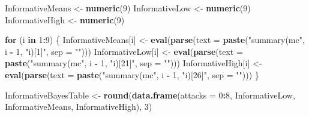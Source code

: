 \documentclass[10pt,]{scrartcl}
\newenvironment{Shaded}{\begin{snugshade}}{\end{snugshade}}
\newcommand{\KeywordTok}[1]{\textcolor[rgb]{0.13,0.29,0.53}{\textbf{#1}}}
\newcommand{\DataTypeTok}[1]{\textcolor[rgb]{0.13,0.29,0.53}{#1}}
\newcommand{\DecValTok}[1]{\textcolor[rgb]{0.00,0.00,0.81}{#1}}
\newcommand{\StringTok}[1]{\textcolor[rgb]{0.31,0.60,0.02}{#1}}
\newcommand{\ControlFlowTok}[1]{\textcolor[rgb]{0.13,0.29,0.53}{\textbf{#1}}}
\newcommand{\OperatorTok}[1]{\textcolor[rgb]{0.81,0.36,0.00}{\textbf{#1}}}
\newcommand{\NormalTok}[1]{#1}
\begin{document}
\begin{Shaded}
\begin{Highlighting}[]
\NormalTok{InformativeMeans <-}\StringTok{ }\KeywordTok{numeric}\NormalTok{(}\DecValTok{9}\NormalTok{)}
\NormalTok{InformativeLow <-}\StringTok{ }\KeywordTok{numeric}\NormalTok{(}\DecValTok{9}\NormalTok{)}
\NormalTok{InformativeHigh <-}\StringTok{ }\KeywordTok{numeric}\NormalTok{(}\DecValTok{9}\NormalTok{)}

\ControlFlowTok{for}\NormalTok{ (i }\ControlFlowTok{in} \DecValTok{1}\OperatorTok{:}\DecValTok{9}\NormalTok{) \{}
\NormalTok{    InformativeMeans[i] <-}\StringTok{ }\KeywordTok{eval}\NormalTok{(}\KeywordTok{parse}\NormalTok{(}\DataTypeTok{text =} \KeywordTok{paste}\NormalTok{(}\StringTok{"summary(mc"}\NormalTok{,}
\NormalTok{        i }\OperatorTok{-}\StringTok{ }\DecValTok{1}\NormalTok{, }\StringTok{"i)[1]"}\NormalTok{, }\DataTypeTok{sep =} \StringTok{""}\NormalTok{)))}
\NormalTok{    InformativeLow[i] <-}\StringTok{ }\KeywordTok{eval}\NormalTok{(}\KeywordTok{parse}\NormalTok{(}\DataTypeTok{text =} \KeywordTok{paste}\NormalTok{(}\StringTok{"summary(mc"}\NormalTok{,}
\NormalTok{        i }\OperatorTok{-}\StringTok{ }\DecValTok{1}\NormalTok{, }\StringTok{"i)[21]"}\NormalTok{, }\DataTypeTok{sep =} \StringTok{""}\NormalTok{)))}
\NormalTok{    InformativeHigh[i] <-}\StringTok{ }\KeywordTok{eval}\NormalTok{(}\KeywordTok{parse}\NormalTok{(}\DataTypeTok{text =} \KeywordTok{paste}\NormalTok{(}\StringTok{"summary(mc"}\NormalTok{,}
\NormalTok{        i }\OperatorTok{-}\StringTok{ }\DecValTok{1}\NormalTok{, }\StringTok{"i)[26]"}\NormalTok{, }\DataTypeTok{sep =} \StringTok{""}\NormalTok{)))}
\NormalTok{\}}

\NormalTok{InformativeBayesTable <-}\StringTok{ }\KeywordTok{round}\NormalTok{(}\KeywordTok{data.frame}\NormalTok{(}\DataTypeTok{attacks =} \DecValTok{0}\OperatorTok{:}\DecValTok{8}\NormalTok{, InformativeLow,}
\NormalTok{    InformativeMeans, InformativeHigh), }\DecValTok{3}\NormalTok{)}


\end{Highlighting}
\end{Shaded}
\end{document}
